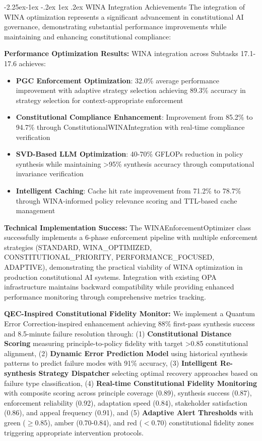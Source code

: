 \documentclass[manuscript,screen,review,anonymous,9pt]{acmart}
\makeatletter
\renewcommand\subsection{\@startsection{subsection}{2}{\z@}%
  {-2.25ex\@plus -1ex \@minus -.2ex}%
  {1ex \@plus .2ex}%
  {\normalfont\large\bfseries}}
\makeatother
\begin{document}
\subsection{WINA Integration Achievements}
\label{subsec:wina_integration_achievements}
The integration of WINA optimization represents a significant advancement in constitutional AI governance, demonstrating substantial performance improvements while maintaining and enhancing constitutional compliance:

\textbf{Performance Optimization Results:} WINA integration across Subtasks 17.1-17.6 achieves:
\begin{itemize}
	\item \textbf{PGC Enforcement Optimization}: 32.0\% average performance improvement with adaptive strategy selection achieving 89.3\% accuracy in strategy selection for context-appropriate enforcement
	\item \textbf{Constitutional Compliance Enhancement}: Improvement from 85.2\% to 94.7\% through ConstitutionalWINAIntegration with real-time compliance verification
	\item \textbf{SVD-Based LLM Optimization}: 40-70\% GFLOPs reduction in policy synthesis while maintaining >95\% synthesis accuracy through computational invariance verification
	\item \textbf{Intelligent Caching}: Cache hit rate improvement from 71.2\% to 78.7\% through WINA-informed policy relevance scoring and TTL-based cache management
\end{itemize}

\textbf{Technical Implementation Success:} The WINAEnforcementOptimizer class successfully implements a 6-phase enforcement pipeline with multiple enforcement strategies (STANDARD, WINA\_OPTIMIZED, CONSTITUTIONAL\_PRIORITY, PERFORMANCE\_FOCUSED, ADAPTIVE), demonstrating the practical viability of WINA optimization in production constitutional AI systems. Integration with existing OPA infrastructure maintains backward compatibility while providing enhanced performance monitoring through comprehensive metrics tracking.

\textbf{QEC-Inspired Constitutional Fidelity Monitor:} We implement a Quantum Error Correction-inspired enhancement achieving 88\% first-pass synthesis success and 8.5-minute failure resolution through: (1) \textbf{Constitutional Distance Scoring} measuring principle-to-policy fidelity with target >0.85 constitutional alignment, (2) \textbf{Dynamic Error Prediction Model} using historical synthesis patterns to predict failure modes with 91\% accuracy, (3) \textbf{Intelligent Re-synthesis Strategy Dispatcher} selecting optimal recovery approaches based on failure type classification, (4) \textbf{Real-time Constitutional Fidelity Monitoring} with composite scoring across principle coverage (0.89), synthesis success (0.87), enforcement reliability (0.92), adaptation speed (0.84), stakeholder satisfaction (0.86), and appeal frequency (0.91), and (5) \textbf{Adaptive Alert Thresholds} with green ($\geq 0.85$), amber (0.70-0.84), and red ($< 0.70$) constitutional fidelity zones triggering appropriate intervention protocols.
\end{document}

